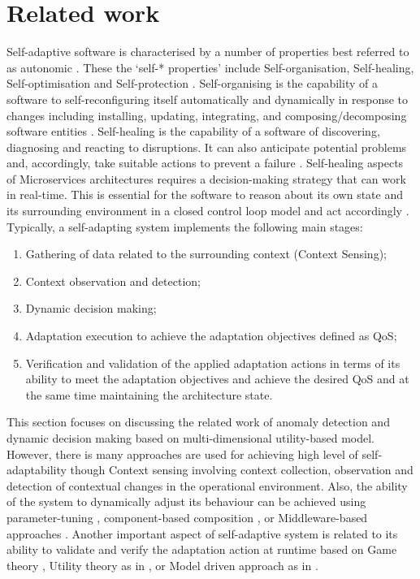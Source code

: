 \documentclass[sigconf]{acmart}
\begin{document}
\section{Related work}
\label{sec:related-work}

Self-adaptive software is characterised by a number of properties best referred to as   autonomic \cite{jelasityself}. These the `self-* properties' include Self-organisation, Self-healing, Self-optimisation and Self-protection  \cite{horn:2001p3735}. Self-organising is the capability of a software to self-reconfiguring itself automatically and dynamically in response to changes including installing, updating, integrating, and composing/decomposing software entities \cite{Salehie:2009p3693}. Self-healing is the capability of a software of discovering, diagnosing and reacting to disruptions. It can also anticipate potential problems and, accordingly, take suitable actions to prevent a failure \cite{horn:2001p3735}. 
Self-healing aspects of Microservices architectures requires a decision-making strategy that can work in real-time. This is essential for the software to reason about its own state and its surrounding environment in a closed control loop model and act accordingly \cite{Cheng:2008p3708}.  
Typically, a self-adapting system implements the following main stages: 
\begin{enumerate}
\item Gathering of data related to the surrounding context (Context Sensing);
\item Context observation and detection;
\item Dynamic decision making;
\item Adaptation execution to achieve the adaptation objectives defined as QoS;
\item Verification and validation of the applied adaptation actions in terms of its ability to meet the adaptation objectives and achieve the desired QoS and at the same time maintaining the architecture state.
\end{enumerate}

This section focuses on discussing the related work of anomaly detection and dynamic decision making based on multi-dimensional utility-based model. However, there is many approaches are used for achieving high level of self-adaptability though Context sensing involving context collection, observation and detection of contextual changes in the operational environment. Also, the ability of the system to dynamically adjust its behaviour can be achieved using parameter-tuning \cite{Cheng:2009p3902}, component-based composition \cite{MariusMikalsen:2005ur}, or Middleware-based  approaches \cite{CheungFooWo:2007p1692}. Another important aspect of self-adaptive system is related to its ability to validate and verify the adaptation action at runtime based on Game theory \cite{Wei:2016ge}, Utility theory as in \cite{Menasce:2007vq,KonstantinosKakousis:2008ub}, or Model driven approach as in \cite{Sama:2008p3765}.
\end{document}
